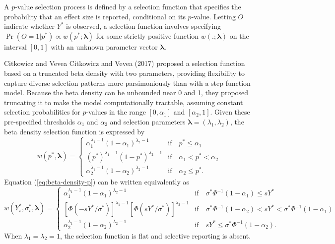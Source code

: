 \documentclass[
  american,
  man, donotrepeattitle,floatsintext]{apa7}
\begin{document}
A \(p\)-value selection process is defined by a selection function that specifies the probability that an effect size is reported, conditional on its \(p\)-value. Letting \(O\) indicate whether \(Y^*\) is observed, a selection function involves specifying \(\Pr\left(O = 1 | p^* \right) \propto w\left(p^*; \boldsymbol\lambda \right)\) for some strictly positive function \(w\left(.; \boldsymbol\lambda\right)\) on the interval \([0, 1]\) with an unknown parameter vector \(\boldsymbol\lambda\).

Citkowicz and Vevea Citkowicz and Vevea (2017) proposed a selection function based on a truncated beta density with two parameters, providing flexibility to capture diverse selection patterns more parsimoniously than with a step function model. Because the beta density can be unbounded near 0 and 1, they proposed truncating it to make the model computationally tractable, assuming constant selection probabilities for \(p\)-values in the range \([0, \alpha_1]\) and \([\alpha_2, 1]\). Given these pre-specified thresholds \(\alpha_1\) and \(\alpha_2\) and selection parameters \(\boldsymbol\lambda = (\lambda_1, \lambda_2)\), the beta density selection function is expressed by
\begin{equation}
\label{eq:beta-density-p}
w(p^*, \boldsymbol\lambda) =  \begin{cases} 
\alpha_1^{\lambda_1 - 1} (1 - \alpha_1)^{\lambda_2 - 1} & \text{if} \quad p^* \leq \alpha_1 \\
\left(p^*\right)^{\lambda_1 - 1} (1 - p^*)^{\lambda_2 - 1} & \text{if} \quad \alpha_1 < p^* < \alpha_2 \\
\alpha_2^{\lambda_1 - 1} (1 - \alpha_2)^{\lambda_2 - 1} & \text{if} \quad \alpha_2 \leq p^*.
\end{cases}
\end{equation}
Equation (\ref{eq:beta-density-p}) can be written equivalently as
\begin{equation}
\label{eq:beta-density-y}
w(Y^*_i, \sigma^*_i, \boldsymbol\lambda) =  \begin{cases} 
\alpha_1^{\lambda_1 - 1} (1 - \alpha_1)^{\lambda_2 - 1} & \text{if} \quad \sigma^* \Phi^{-1}(1 - \alpha_1) \leq s Y^* \\
\left[\Phi\left(- s Y^* / \sigma^*\right)\right]^{\lambda_1 - 1} \left[\Phi\left( s Y^* / \sigma^*\right)\right]^{\lambda_2 - 1} & \text{if} \quad \sigma^* \Phi^{-1}(1 - \alpha_2) < sY^* < \sigma^* \Phi^{-1}(1 - \alpha_1) \\
\alpha_2^{\lambda_1 - 1} (1 - \alpha_2)^{\lambda_2 - 1} & \text{if} \quad  s Y^* \leq \sigma^* \Phi^{-1}(1 - \alpha_2).
\end{cases}
\end{equation}
When \(\lambda_1 = \lambda_2 = 1\), the selection function is flat and selective reporting is absent.
\end{document}
